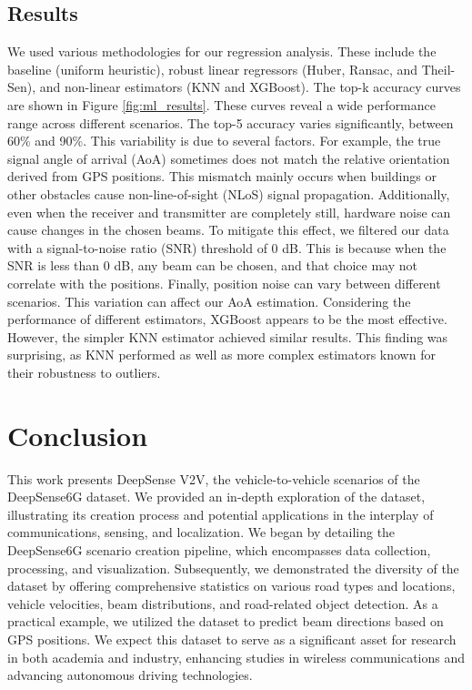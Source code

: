 \documentclass[10pt,comsoc]{IEEEtran}
\begin{document}
\subsection{Results}
We used various methodologies for our regression analysis. These include the baseline (uniform heuristic), robust linear regressors (Huber, Ransac, and Theil-Sen), and non-linear estimators (KNN and XGBoost). The top-k accuracy curves are shown in Figure \ref{fig:ml_results}. These curves reveal a wide performance range across different scenarios. The top-5 accuracy varies significantly, between 60\% and 90\%. This variability is due to several factors. For example, the true signal angle of arrival (AoA) sometimes does not match the relative orientation derived from GPS positions. This mismatch mainly occurs when buildings or other obstacles cause non-line-of-sight (NLoS) signal propagation. Additionally, even when the receiver and transmitter are completely still, hardware noise can cause changes in the chosen beams. To mitigate this effect, we filtered our data with a signal-to-noise ratio (SNR) threshold of 0 dB. This is because when the SNR is less than 0 dB, any beam can be chosen, and that choice may not correlate with the positions. Finally, position noise can vary between different scenarios. This variation can affect our AoA estimation. Considering the performance of different estimators, XGBoost appears to be the most effective. However, the simpler KNN estimator achieved similar results. This finding was surprising, as KNN performed as well as more complex estimators known for their robustness to outliers.




\section{Conclusion}
This work presents DeepSense V2V, the vehicle-to-vehicle scenarios of the DeepSense6G dataset. We provided an in-depth exploration of the dataset, illustrating its creation process and potential applications in the interplay of communications, sensing, and localization. We began by detailing the DeepSense6G scenario creation pipeline, which encompasses data collection, processing, and visualization. Subsequently, we demonstrated the diversity of the dataset by offering comprehensive statistics on various road types and locations, vehicle velocities, beam distributions, and road-related object detection. As a practical example, we utilized the dataset to predict beam directions based on GPS positions. We expect this dataset to serve as a significant asset for research in both academia and industry, enhancing studies in wireless communications and advancing autonomous driving technologies.
\end{document}
